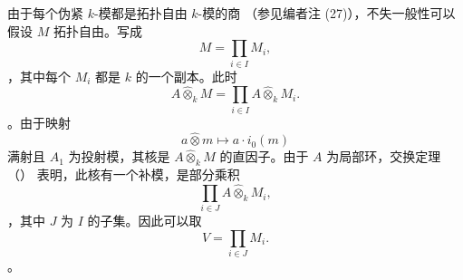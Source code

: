 由于每个伪紧 \(k\)-模都是拓扑自由 \(k\)-模的商 \textup{（参见编者注 \textup{(27)}）}，不失一般性可以假设 \(M\) 拓扑自由。写成 \[
  M=\prod_{i\in I}M_i,
\]，其中每个 \(M_i\) 都是 \(k\) 的一个副本。此时 \[
  A\widehat{\otimes}_kM
  =
  \prod_{i\in I}
  A\widehat{\otimes}_kM_i.
\]。由于映射 \[
  a\widehat{\otimes}m\longmapsto a\cdot i_0(m)
\] 满射且 \(A_1\) 为投射模，其核是 \(A\widehat{\otimes}_kM\) 的直因子。由于 \(A\) 为局部环，交换定理 \textup{（）} 表明，此核有一个补模，是部分乘积 \[
  \prod_{i\in J}A\widehat{\otimes}_kM_i,
\]，其中 \(J\) 为 \(I\) 的子集。因此可以取 \[
  V=\prod_{i\in J}M_i.
\]。


